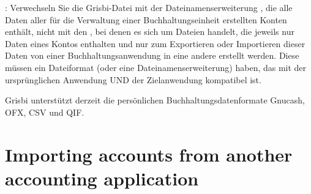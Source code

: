 
\Note{}: Verwechseln Sie die Grisbi-Datei mit der \gls{Dateinamenserweiterung} , die alle Daten aller für die Verwaltung einer Buchhaltungseinheit erstellten Konten enthält, nicht mit den , bei denen es sich um Dateien handelt, die jeweils nur Daten eines Kontos enthalten und nur zum Exportieren oder Importieren dieser Daten von einer Buchhaltungsanwendung in eine andere erstellt werden. Diese  müssen ein \gls{Dateiformat} (oder eine \gls{Dateinamenserweiterung}) haben, das mit der ursprünglichen Anwendung UND der Zielanwendung kompatibel ist.


Grisbi unterstützt derzeit die persönlichen Buchhaltungsdatenformate \gls{Gnucash}, \gls{OFX}, \gls{CSV} und \gls{QIF}.

\section{Importing accounts from another accounting application\label{importexport-import}}


